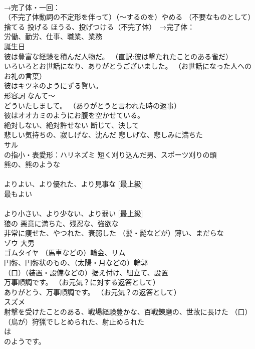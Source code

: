 \documentclass[8pt]{extreport}
\begin{document}
\begin{CJK}{UTF8}{min}
\\	→完了体・一回：
\\	（不完了体動詞の不定形を伴って）（〜するのを）やめる （不要なものとして）捨てる 投げる ほうる、投げつける（不完了体）　→完了体：
\\	労働、勤労、仕事、職業、業務
\\	誕生日
\\	彼は豊富な経験を積んだ人物だ。 （直訳:彼は撃たれたことのある雀だ）
\\	いろいろとお世話になり、ありがとうございました。 （お世話になった人へのお礼の言葉）
\\	彼はキツネのようにずる賢い。
\\	形容詞	なんて〜
\\	どういたしまして。 （ありがとうと言われた時の返事）
\\	彼はオオカミのようにお腹を空かせている。
\\	絶対しない、絶対許せない 断じて、決して
\\	悲しい気持ちの、寂しげな、沈んだ 悲しげな、悲しみに満ちた
\\	サル
\\	の指小・表愛形：ハリネズミ 短く刈り込んだ男、スポーツ刈りの頭
\\	熊の、熊のような
\\	[比較級]
\\	よりよい、より優れた、より見事な [最上級]
\\	最もよい
\\	[比較級]
\\	より小さい、より少ない、より弱い [最上級]
\\	狼の 悪意に満ちた、残忍な、強欲な
\\	非常に痩せた、やつれた、衰弱した （髪・髭などが）薄い、まだらな
\\	ゾウ 大男
\\	ゴムタイヤ （馬車などの）輪金、リム
\\	円盤、円盤状のもの、（太陽・月などの）輪郭
\\	（口）（装置・設備などの）据え付け、組立て、設置
\\	万事順調です。 （お元気？に対する返答として）
\\	ありがとう、万事順調です。 （お元気？の返答として）
\\	スズメ
\\	射撃を受けたことのある、戦場経験豊かな、百戦錬磨の、世故に長けた （口）（鳥が）狩猟でしとめられた、射止められた
\\	は
\\	のようです。

\end{CJK}
\end{document}
